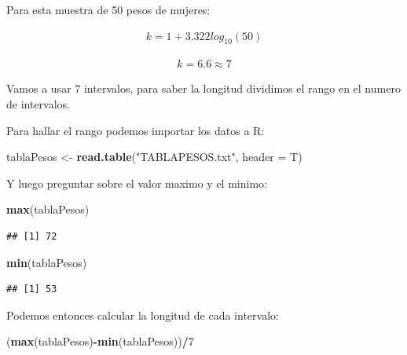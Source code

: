 \documentclass[twocolumn]{article}
\newenvironment{Shaded}{\begin{snugshade}}{\end{snugshade}}
\newcommand{\KeywordTok}[1]{\textcolor[rgb]{0.13,0.29,0.53}{\textbf{#1}}}
\newcommand{\DataTypeTok}[1]{\textcolor[rgb]{0.13,0.29,0.53}{#1}}
\newcommand{\DecValTok}[1]{\textcolor[rgb]{0.00,0.00,0.81}{#1}}
\newcommand{\StringTok}[1]{\textcolor[rgb]{0.31,0.60,0.02}{#1}}
\newcommand{\OperatorTok}[1]{\textcolor[rgb]{0.81,0.36,0.00}{\textbf{#1}}}
\newcommand{\NormalTok}[1]{#1}
\begin{document}
Para esta muestra de 50 pesos de mujeres:

\begin{align}
k = 1 + 3.322 log_{10} (50)
\end{align}

\begin{align}
k = 6.6 \approx 7
\end{align}

Vamos a usar 7 intervalos, para saber la longitud dividimos el rango en
el numero de intervalos.

Para hallar el rango podemos importar los datos a R:

\begin{Shaded}
\begin{Highlighting}[]
\NormalTok{tablaPesos <-}\StringTok{ }\KeywordTok{read.table}\NormalTok{(}\StringTok{"TABLAPESOS.txt"}\NormalTok{, }\DataTypeTok{header =}\NormalTok{ T)}
\end{Highlighting}
\end{Shaded}

Y luego preguntar sobre el valor maximo y el minimo:

\begin{Shaded}
\begin{Highlighting}[]
\KeywordTok{max}\NormalTok{(tablaPesos)}
\end{Highlighting}
\end{Shaded}

\begin{verbatim}
## [1] 72
\end{verbatim}

\begin{Shaded}
\begin{Highlighting}[]
\KeywordTok{min}\NormalTok{(tablaPesos)}
\end{Highlighting}
\end{Shaded}

\begin{verbatim}
## [1] 53
\end{verbatim}

Podemos entonces calcular la longitud de cada intervalo:

\begin{Shaded}
\begin{Highlighting}[]
\NormalTok{(}\KeywordTok{max}\NormalTok{(tablaPesos)}\OperatorTok{-}\KeywordTok{min}\NormalTok{(tablaPesos))}\OperatorTok{/}\DecValTok{7}
\end{Highlighting}
\end{Shaded}
\end{document}
